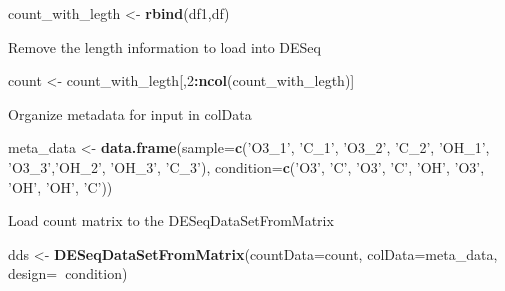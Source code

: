 \documentclass[]{article}
\newenvironment{Shaded}{\begin{snugshade}}{\end{snugshade}}
\newcommand{\DataTypeTok}[1]{\textcolor[rgb]{0.13,0.29,0.53}{#1}}
\newcommand{\DecValTok}[1]{\textcolor[rgb]{0.00,0.00,0.81}{#1}}
\newcommand{\KeywordTok}[1]{\textcolor[rgb]{0.13,0.29,0.53}{\textbf{#1}}}
\newcommand{\NormalTok}[1]{#1}
\newcommand{\OperatorTok}[1]{\textcolor[rgb]{0.81,0.36,0.00}{\textbf{#1}}}
\newcommand{\StringTok}[1]{\textcolor[rgb]{0.31,0.60,0.02}{#1}}
\begin{document}
\begin{Shaded}
\begin{Highlighting}[]
\NormalTok{count_with_legth <-}\StringTok{ }\KeywordTok{rbind}\NormalTok{(df1,df)}
\end{Highlighting}
\end{Shaded}

Remove the length information to load into DESeq

\begin{Shaded}
\begin{Highlighting}[]
\NormalTok{count <-}\StringTok{ }\NormalTok{count_with_legth[,}\DecValTok{2}\OperatorTok{:}\KeywordTok{ncol}\NormalTok{(count_with_legth)]}
\end{Highlighting}
\end{Shaded}

Organize metadata for input in colData

\begin{Shaded}
\begin{Highlighting}[]
\NormalTok{meta_data <-}\StringTok{ }\KeywordTok{data.frame}\NormalTok{(}\DataTypeTok{sample=}\KeywordTok{c}\NormalTok{(}\StringTok{'O3_1'}\NormalTok{, }\StringTok{'C_1'}\NormalTok{, }\StringTok{'O3_2'}\NormalTok{, }\StringTok{'C_2'}\NormalTok{, }\StringTok{'OH_1'}\NormalTok{, }\StringTok{'O3_3'}\NormalTok{,}\StringTok{'OH_2'}\NormalTok{, }\StringTok{'OH_3'}\NormalTok{, }\StringTok{'C_3'}\NormalTok{),}
                        \DataTypeTok{condition=}\KeywordTok{c}\NormalTok{(}\StringTok{'O3'}\NormalTok{, }\StringTok{'C'}\NormalTok{, }\StringTok{'O3'}\NormalTok{, }\StringTok{'C'}\NormalTok{, }\StringTok{'OH'}\NormalTok{, }\StringTok{'O3'}\NormalTok{, }\StringTok{'OH'}\NormalTok{, }\StringTok{'OH'}\NormalTok{, }\StringTok{'C'}\NormalTok{))}
\end{Highlighting}
\end{Shaded}

Load count matrix to the DESeqDataSetFromMatrix

\begin{Shaded}
\begin{Highlighting}[]
\NormalTok{dds <-}\StringTok{ }\KeywordTok{DESeqDataSetFromMatrix}\NormalTok{(}\DataTypeTok{countData=}\NormalTok{count, }
                              \DataTypeTok{colData=}\NormalTok{meta_data, }
                              \DataTypeTok{design=}\OperatorTok{~}\NormalTok{condition)}
\end{Highlighting}
\end{Shaded}
\end{document}
